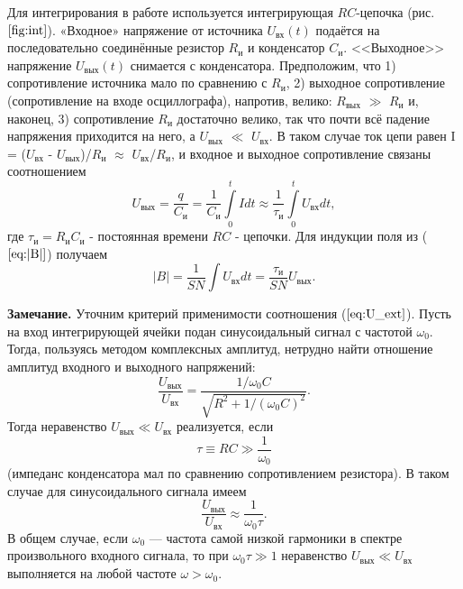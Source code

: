 \documentclass[a4paper,12pt]{article} %
\begin{document}
Для интегрирования в работе используется интегрирующая $ RC $-цепочка (рис. $ \ref{fig:int} $).
«Входное» напряжение от источника $U_{\text{вх}}(t)$ подаётся на последовательно соединённые резистор $R_\text{и}$ и конденсатор $C_\text{и}$. <<Выходное>>
напряжение $U_{\text{вых}}(t)$ снимается с конденсатора. Предположим, что 1) сопротивление источника мало по сравнению с $R_\text{и}$, 2) выходное сопротивление (сопротивление на входе осциллографа), напротив, велико: $R_{\text{вых}}$ $ \gg $ $R_\text{и}$ и, наконец, 3) сопротивление $R_\text{и}$ достаточно велико, так что почти всё падение напряжения приходится на него, а $U_{\text{вых}}$ $\ll$ $U_{\text{вх}}$. В таком случае ток цепи равен I = ($U_{\text{вх}}$ - $U_{\text{вых}}$)/$R_\text{и}$ $\approx$ $U_{\text{вх}}$/$R_\text{и}$, и входное и выходное сопротивление связаны соотношением
\begin{equation}
U_{\text{вых}} = \frac{q}{C_\text{и}} = \frac{1}{C_\text{и}}\int\limits_0^t Idt \approx \frac{1}{\tau_\text{и}} \int\limits_0^t U_{\text{вх}}dt,
\label{eq:U_ext}
\end{equation}
где $\tau_\text{и}=R_\text{и}C_\text{и}$ - постоянная времени $ RC $ - цепочки. Для индукции поля из ($\ref{eq:|B|}$) получаем 
\begin{equation}
|B|=\frac{1}{SN}\int U_{\text{вх}} dt=\frac{\tau_\text{и}}{SN}U_{\text{вых}}.
\label{eq:|B|new}
\end{equation}

\textbf{Замечание.} Уточним критерий применимости соотношения ($\ref{eq:U_ext}$). Пусть на вход интегрирующей ячейки подан синусоидальный сигнал с частотой $\omega_0$. Тогда, пользуясь методом комплексных амплитуд, нетрудно найти отношение амплитуд входного и выходного напряжений:
\begin{equation}
\frac{U_{\text{вых}}}{U_{\text{вх}}}=\frac{1/\omega_0C}{\sqrt{R^2+1/(\omega_0C)^2}}.
\end{equation}
Тогда неравенство $U_{\text{вых}} \ll U_{\text{вх}}$ реализуется, если 
\begin{equation}
\tau \equiv RC\gg \frac{1}{\omega_0}
\end{equation}
(импеданс конденсатора мал по сравнению сопротивлением резистора).
В таком случае для синусоидального сигнала имеем
\begin{equation}
\frac{U_{\text{вых}}}{U_{\text{вх}}}\approx\frac{1}{\omega_0\tau}.
\end{equation}
В общем случае, если $\omega_0$ — частота самой низкой гармоники в спектре
произвольного входного сигнала, то при $\omega_0\tau \gg 1$ неравенство $U_{\text{вых}} \ll U_{\text{вх}}$ выполняется на любой частоте $\omega > \omega_0$.
\end{document}
